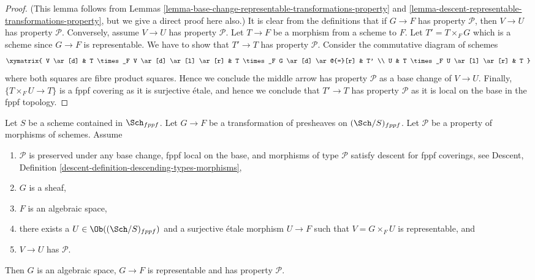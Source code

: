 \begin{proof}
(This lemma follows from
Lemmas \ref{lemma-base-change-representable-transformations-property} and
\ref{lemma-descent-representable-transformations-property},
but we give a direct proof here also.)
It is clear from the definitions that if $G \to F$ has property
$\mathcal{P}$, then $V \to U$ has property $\mathcal{P}$.
Conversely, assume $V \to U$ has property $\mathcal{P}$.
Let $T \to F$ be a morphism from a scheme to $F$.
Let $T' = T \times_F G$ which is a scheme since $G \to F$ is
representable. We have to show that $T' \to T$ has property $\mathcal{P}$.
Consider the commutative diagram of schemes
$$
\xymatrix{
V \ar[d] & T \times_F V \ar[d] \ar[l] \ar[r] &
T \times_F G \ar[d] \ar@{=}[r] & T' \\
U & T \times_F U \ar[l] \ar[r] & T
}
$$
where both squares are fibre product squares. Hence we conclude
the middle arrow has property $\mathcal{P}$ as a base change
of $V \to U$. Finally, $\{T \times_F U \to T\}$ is a fppf covering
as it is surjective \'etale, and hence we conclude that
$T' \to T$ has property $\mathcal{P}$ as it is local on the
base in the fppf topology.
\end{proof}

\begin{lemma}
\label{lemma-morphism-sheaves-with-P-effective-descent-etale}
Let $S$ be a scheme contained in $\Sch_{fppf}$.
Let $G \to F$ be a transformation of presheaves on $(\Sch/S)_{fppf}$.
Let $\mathcal{P}$ be a property of morphisms of schemes.
Assume
\begin{enumerate}
\item $\mathcal{P}$ is preserved under any base change, fppf local on the
base, and morphisms of type $\mathcal{P}$ satisfy descent for fppf coverings,
see Descent, Definition \ref{descent-definition-descending-types-morphisms},
\item $G$ is a sheaf,
\item $F$ is an algebraic space,
\item there exists a $U \in \Ob((\Sch/S)_{fppf})$
and a surjective \'etale morphism $U \to F$ such that
$V = G \times_F U$ is representable, and
\item $V \to U$ has $\mathcal{P}$.
\end{enumerate}
Then $G$ is an algebraic space, $G \to F$ is representable and has property
$\mathcal{P}$.
\end{lemma}

